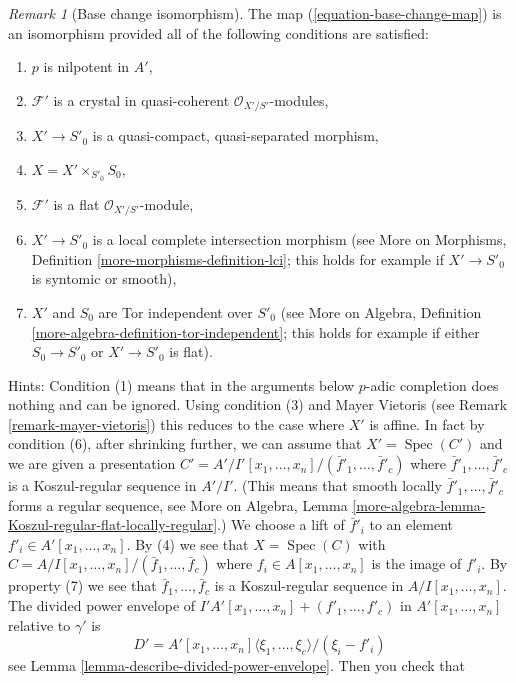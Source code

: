 \documentclass{stacks-project}
\theoremstyle{plain}
\theoremstyle{definition}
\theoremstyle{remark}
\newtheorem{remark}[subsection]{Remark}
\numberwithin{equation}{subsection}
\def\Spec{\mathop{\mathrm{Spec}}}
\begin{document}
\begin{remark}[Base change isomorphism]
\label{remark-base-change-isomorphism}
The map (\ref{equation-base-change-map}) is an isomorphism provided
all of the following conditions are satisfied:
\begin{enumerate}
\item $p$ is nilpotent in $A'$,
\item $\mathcal{F}'$ is a crystal in quasi-coherent
$\mathcal{O}_{X'/S'}$-modules,
\item $X' \to S'_0$ is a quasi-compact, quasi-separated morphism,
\item $X = X' \times_{S'_0} S_0$,
\item $\mathcal{F}'$ is a flat $\mathcal{O}_{X'/S'}$-module,
\item $X' \to S'_0$ is a local complete intersection morphism (see
More on Morphisms, Definition \ref{more-morphisms-definition-lci}; this
holds for example if $X' \to S'_0$ is syntomic or smooth),
\item $X'$ and $S_0$ are Tor independent over $S'_0$ (see
More on Algebra, Definition \ref{more-algebra-definition-tor-independent};
this holds for example if either $S_0 \to S'_0$ or $X' \to S'_0$ is flat).
\end{enumerate}
Hints: Condition (1) means that in the arguments below $p$-adic completion
does nothing and can be ignored.
Using condition (3) and Mayer Vietoris (see
Remark \ref{remark-mayer-vietoris}) this reduces to the case
where $X'$ is affine. In fact by condition (6), after shrinking
further, we can assume that $X' = \Spec(C')$ and we are given a presentation
$C' = A'/I'[x_1, \ldots, x_n]/(\bar f'_1, \ldots, \bar f'_c)$
where $\bar f'_1, \ldots, \bar f'_c$ is a Koszul-regular sequence in $A'/I'$.
(This means that smooth locally $\bar f'_1, \ldots, \bar f'_c$ forms
a regular sequence, see More on Algebra,
Lemma \ref{more-algebra-lemma-Koszul-regular-flat-locally-regular}.)
We choose a lift of
$\bar f'_i$ to an element $f'_i \in A'[x_1, \ldots, x_n]$. By (4) we see that
$X = \Spec(C)$ with $C = A/I[x_1, \ldots, x_n]/(\bar f_1, \ldots, \bar f_c)$
where $f_i \in A[x_1, \ldots, x_n]$ is the image of $f'_i$.
By property (7) we see that $\bar f_1, \ldots, \bar f_c$ is a Koszul-regular
sequence in $A/I[x_1, \ldots, x_n]$. The divided power envelope of
$I'A'[x_1, \ldots, x_n] + (f'_1, \ldots, f'_c)$ in $A'[x_1, \ldots, x_n]$
relative to $\gamma'$ is
$$
D' = A'[x_1, \ldots, x_n]\langle \xi_1, \ldots, \xi_c \rangle/(\xi_i - f'_i)
$$
see Lemma \ref{lemma-describe-divided-power-envelope}. Then you check that

\end{remark}
\end{document}
